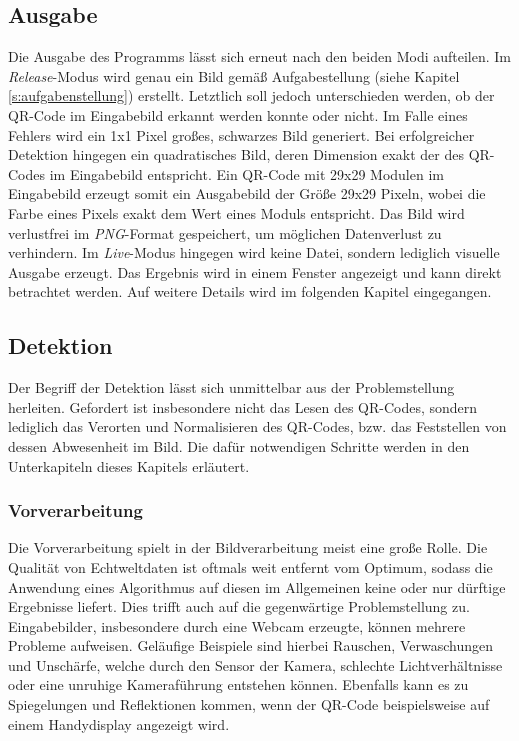 \documentclass[a4paper, oneside, 12pt]{article}
\begin{document}
\subsection{Ausgabe}
\label{s:ausgabe}

Die Ausgabe des Programms lässt sich erneut nach den beiden Modi aufteilen.
Im \emph{Release}-Modus wird genau ein Bild gemäß Aufgabestellung (siehe Kapitel \ref{s:aufgabenstellung}) erstellt. Letztlich soll jedoch unterschieden werden, ob der QR-Code im Eingabebild erkannt werden konnte oder nicht. Im Falle eines Fehlers wird ein 1x1 Pixel großes, schwarzes Bild generiert. Bei erfolgreicher Detektion hingegen ein quadratisches Bild, deren Dimension exakt der des QR-Codes im Eingabebild entspricht.
Ein QR-Code mit 29x29 Modulen im Eingabebild erzeugt somit ein Ausgabebild der Größe 29x29 Pixeln, wobei die Farbe eines Pixels exakt dem Wert eines Moduls entspricht.
Das Bild wird verlustfrei im \emph{PNG}-Format gespeichert, um möglichen Datenverlust zu verhindern.
Im \emph{Live}-Modus hingegen wird keine Datei, sondern lediglich visuelle Ausgabe erzeugt. Das Ergebnis wird in einem Fenster angezeigt und kann direkt betrachtet werden. Auf weitere Details wird im folgenden Kapitel eingegangen.

\subsection{Detektion}
\label{s:detektion}

Der Begriff der Detektion lässt sich unmittelbar aus der Problemstellung herleiten.
Gefordert ist insbesondere nicht das Lesen des QR-Codes, sondern lediglich das Verorten und Normalisieren des QR-Codes, bzw. das Feststellen von dessen Abwesenheit im Bild. Die dafür notwendigen Schritte werden in den Unterkapiteln dieses Kapitels erläutert.

\subsubsection{Vorverarbeitung}
Die Vorverarbeitung spielt in der Bildverarbeitung meist eine große Rolle. Die Qualität von Echtweltdaten ist oftmals weit entfernt vom Optimum, sodass die Anwendung eines Algorithmus auf diesen im Allgemeinen keine oder nur dürftige Ergebnisse liefert.
Dies trifft auch auf die gegenwärtige Problemstellung zu. Eingabebilder, insbesondere durch eine Webcam erzeugte, können mehrere Probleme aufweisen.
Geläufige Beispiele sind hierbei Rauschen, Verwaschungen und Unschärfe, welche durch den Sensor der Kamera, schlechte Lichtverhältnisse oder eine unruhige Kameraführung entstehen können. Ebenfalls kann es zu Spiegelungen und Reflektionen kommen, wenn  der QR-Code beispielsweise auf einem Handydisplay angezeigt wird.
\end{document}
